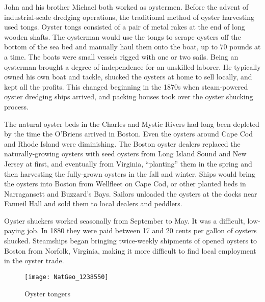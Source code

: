 John and his brother Michael both worked as oystermen.\cite{EdwardFrancis3OBrienBirth:1,Michael2OBrien1886:1,1861John2OBrien:1} Before the advent of industrial-scale dredging operations, the traditional method of oyster harvesting used tongs. Oyster tongs consisted of a pair of metal rakes at the end of long wooden shafts. The oysterman would use the tongs to scrape oysters off the bottom of the sea bed and manually haul them onto the boat, up to 70 pounds at a time. The boats were small vessels rigged with one or two sails.\cite{Botwick:95} Being an oysterman brought a degree of independence for an unskilled laborer. He typically owned his own boat and tackle, shucked the oysters at home to sell locally, and kept all the profits.\cite{MacKenzie:7:1, Botwick:96} This changed beginning in the 1870s when steam-powered oyster dredging ships arrived, and packing houses took over the oyster shucking process.\cite{MacKenzie:5, MacKenzie:7:2} 

The natural oyster beds in the Charles and Mystic Rivers had long been depleted by the time the O'Briens arrived in Boston. Even the oysters around Cape Cod and Rhode Island were diminishing. The Boston oyster dealers replaced the naturally-growing oysters with seed oysters from Long Island Sound and New Jersey at first, and eventually from Virginia, ``planting'' them in the spring and then harvesting the fully-grown oysters in the fall and winter. Ships would bring the oysters into Boston from Wellfleet on Cape Cod, or other planted beds in Narragansett and Buzzard's Bays. Sailors unloaded the oysters at the docks near Fanueil Hall and sold them to local dealers and peddlers.\cite{Ingersoll:27-28} 

Oyster shuckers worked seasonally from September to May. It was a difficult, low-paying job. In 1880 they were paid between 17 and 20 cents per gallon of oysters shucked. Steamships began bringing twice-weekly shipments of opened oysters to Boston from Norfolk, Virginia, making it more difficult to find local employment in the oyster trade.\cite{Ingersoll:30}

\begin{figure}
	\centering
	\texttt{[image: NatGeo\_1238550]}
	\caption{Oyster tongers}
	\label{fig:OysterTongers}
\end{figure}

